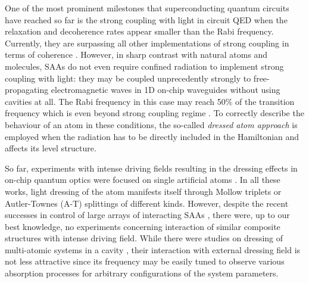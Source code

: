 \documentclass[%
 aps, prx,
 amsmath,amssymb,
 reprint,%
superscriptaddress
]{revtex4-2}
\begin{document}
One of the most prominent milestones that 
superconducting quantum circuits have reached so 
far is the strong coupling with light in {circuit 
QED} \cite{wallraff2004strong, 
chiorescu2004coherent} when the relaxation and decoherence rates 
appear smaller than the Rabi frequency. 
Currently, they are surpassing all other 
implementations of strong coupling in terms of 
coherence \cite{forn2019ultrastrong}. 
However, in sharp contrast with natural atoms and 
molecules, SAAs do not even require confined 
radiation to implement strong coupling with 
light: they may be coupled unprecedently strongly 
to free-propagating electromagnetic waves in 1D 
on-chip waveguides \cite{astafiev2010resonance} 
without using cavities at all. The Rabi frequency 
in this case may reach 50\% of the transition 
frequency \cite{deng2015observation} which is even 
beyond strong coupling 
regime \cite{forn2019ultrastrong}. To correctly 
describe the behaviour of an atom in these 
conditions, the so-called \textit{dressed atom 
approach} \cite{cohen1998atom} is employed when 
the radiation has to be directly included in the 
Hamiltonian and affects its level structure.

So far, experiments with intense driving fields resulting in the dressing effects in on-chip quantum optics  were 
focused on single artificial 
atoms \cite{baur2009measurement, 
sillanpaa2009autler, astafiev2010resonance, 
novikov2013autler, suri2013observation, 
koshino2013observation, 
braumuller2015multiphoton, peng2018vacuum, 
gasparinetti2019two}. In all these works, light 
dressing of the atom manifests itself through 
Mollow triplets or Autler-Townes (A-T) splittings of 
different kinds. However, despite the recent 
successes in control of large arrays of 
interacting SAAs \cite{Song574, ye2019propagation, 
arute2019quantum}, there were, up to our best 
knowledge, no experiments concerning interaction 
of similar composite structures with intense driving field. While there were studies on dressing 
of multi-atomic systems in a 
cavity \cite{fink2009dressed, 
macha2014implementation, shulga2017observation, 
yang2018probing}, their interaction with external dressing field is not less attractive since its 
frequency may be easily tuned to observe various 
absorption processes for arbitrary configurations 
of the system parameters.
\end{document}
